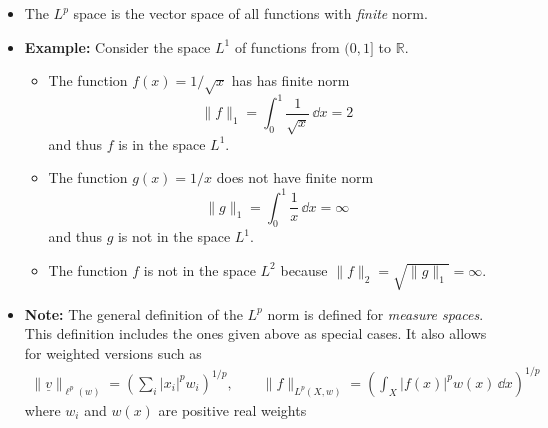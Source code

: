 \documentclass[11pt,twoside]{report}
\newcommand{\bbR}{{\mathbb{R}}}
\newcommand{\vecnot}{\underline}
\begin{document}
\begin{itemize}

\item The $L^p$ space is the vector space of all functions with \emph{finite} norm. 




\item \textbf{Example:} Consider the space $L^1$ of functions from $(0,1]$ to $\bbR$. 
\begin{itemize}
\item The function $f(x) = 1/\sqrt{x}$ has has finite norm
\[
\| f\|_1 %
=  \int_0^1\frac{1}{\sqrt{x}}  \, \dd x =2 %
\]
and thus  $f $ is in the space $L^1$. 
\item The function $g(x) = 1/x$ does not have finite norm
\[
\| g\|_1  =  \int_0^1\frac{1}{x}  \, \dd x =  \infty%
\]
and thus $g $ is not in the space  $L^1$. 

\item The function $f$ is not in the space $L^2$ because $\|f\|_2 =  \sqrt{\|g\|_1 } =  \infty$. 

\end{itemize}

\item \textbf{Note:} The general definition of the  $L^p$ norm is defined for \emph{measure spaces}. This definition includes the ones given above as special cases. It also allows for weighted versions such as
\begin{align*}
\|\vecnot{v} \|_{\ell^p(w)} =  \left( \sum_{i }  |x_i|^p w_i \right)^{1/p} , \qquad \| f\|_{L^p(X, w)} =  \left( \int_X  |f(x)|^p w(x) \, \dd x \right)^{1/p} 
\end{align*}
where $w_i$ and $w(x)$ are positive real weights 
\end{itemize}
\end{document}
